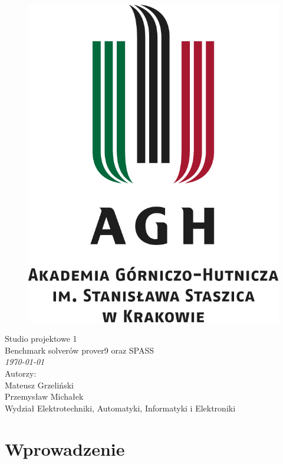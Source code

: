 \documentclass[a4paper,12pt]{article}
\begin{document}
\onehalfspacing
\begin{figure}[!htb]
  \centerline{\includegraphics[scale=0.8]{images/agh_logo.jpg}}
\end{figure}

\begin{center}
  \Huge{Studio projektowe 1\\}
  \Large{Benchmark solverów prover9 oraz SPASS\\ \large \textit \today \\}
  \vspace{3cm}
  \Large{	Autorzy:\\
    Mateusz Grzeliński\\
    Przemysław Michałek\\
  }
  \large{Wydział Elektrotechniki, Automatyki, Informatyki i Elektroniki}

  \newpage
\end{center}

\tableofcontents
\newpage

\section{Wprowadzenie}
\end{document}
